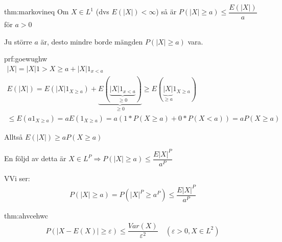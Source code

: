 \begin{theo}{thm:markovineq}
  Om $X\in L^1$ (dvs $E(\left|X\right|)<\infty$) så är $P(\left|X\right|\geq a)\leq\dfrac{E(\left|X\right|)}{a}$ för $a>0$\par
  \noindent Ju större $a$ är, desto mindre borde mängden $P(\left|X\right|\geq a)$ vara.
\end{theo}
\newpage
\begin{prf}{prf:goewughw}
  \begin{equation*}
    \begin{gathered}
      \left|X\right| = \left|X\right|1>{X\geq a}+\left|X\right|1_{x<a}\\
      E(\left|X\right|) = E(\left|X\right|1_{X\geq a})+\underbrace{E(\underbrace{\left|X\right|1_{x<a}}_{\text{$\geq0$}})}_{\text{$\geq0$}}\geq E\left(\underbrace{\left|X\right|}_{\text{$\geq a$}}1_{X\geq a}\right)\\
      \leq E(a1_{X\geq a}) = aE(1_{X\geq a}) = a(1*P(X\geq a)+0*P(X<a)) = aP(X\geq a)
    \end{gathered}
  \end{equation*}\par
  \noindent Alltså $E(\left|X\right|)\geq aP(X\geq a)$
\end{prf}
\par\bigskip
\noindent En följd av detta är $X\in L^P\Rightarrow P(\left|X\right|\geq a)\leq\dfrac{E\left|X\right|^P}{a^P}$
\par\bigskip
\begin{prf}
  VVi ser:
  \begin{equation*}
    \begin{gathered}
      P(\left|X\right|\geq a) = P(\left|X\right|^P\geq a^P)\leq\dfrac{E\left|X\right|^P}{a^P}
    \end{gathered}
  \end{equation*}
\end{prf}
\par\bigskip
\begin{theo}{thm:ahvcehwc}
  \begin{equation*}
    \begin{gathered}
      P(\left|X-E(X)\right|\geq\varepsilon)\leq \dfrac{Var(X)}{\varepsilon^2}\quad (\varepsilon>0, X\in L^2)
    \end{gathered}
  \end{equation*}
\end{theo}
\par\bigskip
